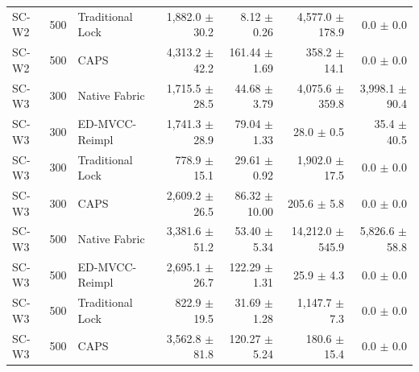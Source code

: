 \documentclass[fleqn,10pt,lineno]{wlpeerj}
\begin{document}
\begin{table}[ht]
\begin{tabularx}{\textwidth}{@{}p{}p{}Xrrrr@{}}
SC-W2 & 500 & Traditional Lock & 1,882.0 $\pm$ 30.2 & 8.12 $\pm$ 0.26 & 4,577.0 $\pm$ 178.9 & 0.0 $\pm$ 0.0 \\
SC-W2 & 500 & CAPS & 4,313.2 $\pm$ 42.2 & 161.44 $\pm$ 1.69 & 358.2 $\pm$ 14.1 & 0.0 $\pm$ 0.0 \\
\addlinespace
SC-W3 & 300 & Native Fabric & 1,715.5 $\pm$ 28.5 & 44.68 $\pm$ 3.79 & 4,075.6 $\pm$ 359.8 & 3,998.1 $\pm$ 90.4 \\
SC-W3 & 300 & ED-MVCC-Reimpl & 1,741.3 $\pm$ 28.9 & 79.04 $\pm$ 1.33 & 28.0 $\pm$ 0.5 & 35.4 $\pm$ 40.5 \\
SC-W3 & 300 & Traditional Lock & 778.9 $\pm$ 15.1 & 29.61 $\pm$ 0.92 & 1,902.0 $\pm$ 17.5 & 0.0 $\pm$ 0.0 \\
SC-W3 & 300 & CAPS & 2,609.2 $\pm$ 26.5 & 86.32 $\pm$ 10.00 & 205.6 $\pm$ 5.8 & 0.0 $\pm$ 0.0 \\
\addlinespace
SC-W3 & 500 & Native Fabric & 3,381.6 $\pm$ 51.2 & 53.40 $\pm$ 5.34 & 14,212.0 $\pm$ 545.9 & 5,826.6 $\pm$ 58.8 \\
SC-W3 & 500 & ED-MVCC-Reimpl & 2,695.1 $\pm$ 26.7 & 122.29 $\pm$ 1.31 & 25.9 $\pm$ 4.3 & 0.0 $\pm$ 0.0 \\
SC-W3 & 500 & Traditional Lock & 822.9 $\pm$ 19.5 & 31.69 $\pm$ 1.28 & 1,147.7 $\pm$ 7.3 & 0.0 $\pm$ 0.0 \\
SC-W3 & 500 & CAPS & 3,562.8 $\pm$ 81.8 & 120.27 $\pm$ 5.24 & 180.6 $\pm$ 15.4 & 0.0 $\pm$ 0.0 \\
\bottomrule
\end{tabularx}
\end{table}
\end{document}
